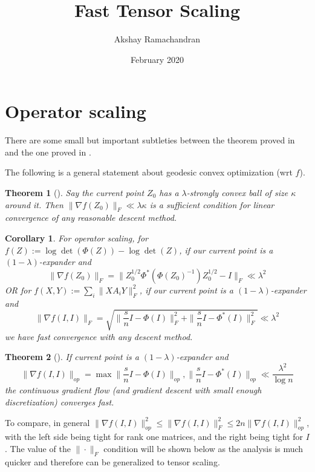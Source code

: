 \documentclass{article}
\title{Fast Tensor Scaling}
\author{Akshay Ramachandran }
\date{February 2020}
\newtheorem{theorem}{Theorem}
\newtheorem{corollary}{Corollary}
\begin{document}
\maketitle



\section{Operator scaling}

There are some small but important subtleties between the theorem proved in \cite{FM20} and the one proved in \cite{KLR19}. 

The following is a general statement about geodesic convex optimization (wrt $f$).
\begin{theorem}[\cite{FM20}]
Say the current point $Z_{0}$ has a $\lambda$-strongly convex ball of size $\kappa$ around it. Then $\|\nabla f(Z_{0})\|_{F} \ll \lambda \kappa$ is a sufficient condition for linear convergence of any reasonable descent method. 
\end{theorem}

\begin{corollary}
For operator scaling, for $f(Z) := \log\det(\Phi(Z)) - \log\det(Z)$, if our current point is a $(1 - \lambda)$-expander and 
\[ \|\nabla f(Z_{0})\|_{F} = \|Z_{0}^{1/2} \Phi^{*}( \Phi(Z_{0})^{-1} ) Z_{0}^{1/2} - I\|_{F} \ll \lambda^{2}   \]
\emph{OR} for $f(X,Y) := \sum_{i} \|X A_{i} Y\|_{F}^{2}$, if our current point is a $(1 - \lambda)$-expander and 
\[ \|\nabla f(I,I)\|_{F} = \sqrt{\|\frac{s}{n} I - \Phi(I)\|_{F}^{2} + \|\frac{s}{n} I - \Phi^{*}(I) \|_{F}^{2}} \ll \lambda^{2}     \]
we have fast convergence with any descent method. 
\end{corollary}

\begin{theorem}[\cite{KLR19}]
If current point is a $(1 - \lambda)$-expander and 
\[  \|\nabla f(I,I)\|_{op} = \max{ \|\frac{s}{n} I - \Phi(I)\|_{op}, \|\frac{s}{n} I - \Phi^{*}(I) \|_{op} } \ll \frac{\lambda^{2}}{\log n}  \]
the continuous gradient flow (and gradient descent with small enough discretization) converges fast. 
\end{theorem}

To compare, in general $\|\nabla f(I,I)\|_{op}^{2} \leq \|\nabla f(I,I)\|_{F}^{2} \leq 2n \|\nabla f(I,I)\|_{op}^{2}$, with the left side being tight for rank one matrices, and the right being tight for $I$. The value of the $\|\cdot\|_{F}$ condition will be shown below as the analysis is much quicker and therefore can be generalized to tensor scaling. 
\end{document}
